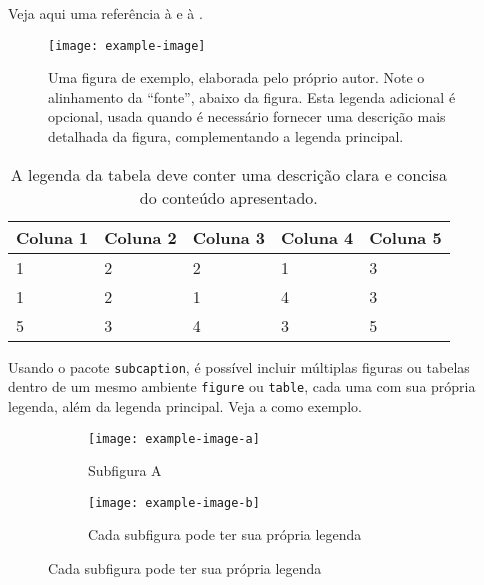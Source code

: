 Veja aqui uma referência à  e à .

\begin{figure}[!htbp]
    \centering
    \caption{Figura de exemplo}
    \label{fig:exemplo}
    \caption*{Uma figura de exemplo, elaborada pelo próprio autor. Note o alinhamento da ``fonte'', abaixo da figura. Esta legenda adicional é opcional, usada quando é necessário fornecer uma descrição mais detalhada da figura, complementando a legenda principal.}
    \texttt{[image: example-image]}
\end{figure}

\begin{table}[!htbp]
    \centering
    \caption{Tabela de exemplo}
    \caption*{A legenda da tabela deve conter uma descrição clara e concisa do conteúdo apresentado.}
    \label{tab:exemplo}
    \begin{tabular}{@{}lllll@{}}
        \toprule
        Coluna 1 & Coluna 2 & Coluna 3 & Coluna 4 & Coluna 5 \\ \midrule
        1        & 2        & 2        & 1        & 3        \\
        1        & 2        & 1        & 4        & 3        \\
        5        & 3        & 4        & 3        & 5        \\ \bottomrule
    \end{tabular}
\end{table}

Usando o pacote \texttt{subcaption}, é possível incluir múltiplas figuras ou tabelas dentro de um
mesmo ambiente \texttt{figure} ou \texttt{table}, cada uma com sua própria legenda, além da legenda
principal. Veja a  como exemplo.

\begin{figure}[!htbp]
    \centering
    \caption[Figura múltipla]{Exemplo de figura múltipla}
    \label{fig:exemplo-multiplo}
    \begin{subfigure}{0.45\textwidth}
        \centering
        \texttt{[image: example-image-a]}
        \caption{Subfigura A}
        \label{fig:subfig-a}
    \end{subfigure}
    \begin{subfigure}{0.45\textwidth}
        \centering
        \texttt{[image: example-image-b]}
        \caption{Subfigura B}
        \caption*{Cada subfigura pode ter sua própria legenda}
        \label{fig:subfig-b}
    \end{subfigure}
\end{figure}

